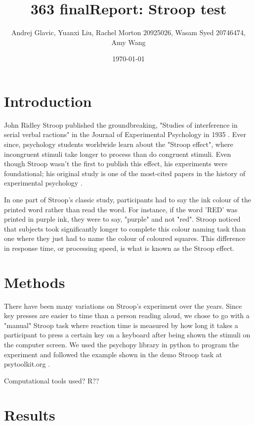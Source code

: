 \documentclass{article}
\author{Andrej Glavic, Yuanxi Liu, Rachel Morton 20925026, Wasam Syed 20746474, Amy Wang}
\date{\today}
\title{363 finalReport: Stroop test}
\begin{document}
\maketitle
\tableofcontents


\section{Introduction}
\label{sec:org617ce89}
John Ridley Stroop published the groundbreaking, "Studies of interference in serial verbal ractions" in the Journal of Experimental Psychology in 1935 \cite{Stroop1935}. Ever since, psychology students worldwide learn about the "Stroop effect", where incongruent stimuli take longer to process than do congruent stimuli. Even though Stroop wasn't the first to publish this effect, his experiments were foundational; his original study is one of the most-cited papers in the history of experimental psychology \cite{MacLeod1991Stroop}.

In one part of Stroop's classic study, participants had to say the ink colour of the printed word rather than read the word. For instance, if the word 'RED' was printed in purple ink, they were to say, "purple" and not "red". Stroop noticed that subjects took significantly longer to complete this colour naming task than one where they just had to name the colour of coloured squares. This difference in response time, or processing speed, is what is known as the Stroop effect.

\section{Methods}
\label{sec:orga546a58}
There have been many variations on Stroop's experiment over the years. Since key presses are easier to time than a person reading aloud, we chose to go with a "manual" Stroop task where reaction time is measured by how long it takes a participant to press a certain key on a keyboard after being shown the stimuli on the computer screen. We used the psychopy library in python to program the experiment \cite{Peirce2019Psychopy} and followed the example shown in the demo Stroop task at psytoolkit.org \cite{PsytoolkitStroopDemo}. 

Computational tools used? R??

\section{Results}
\label{sec:org991c4bb}
\end{document}
